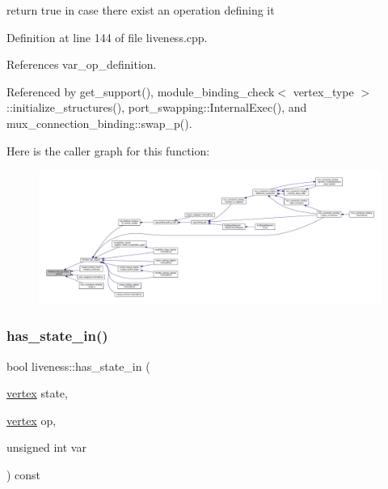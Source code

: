 return true in case there exist an operation defining it 



Definition at line 144 of file liveness.\+cpp.



References var\+\_\+op\+\_\+definition.



Referenced by get\+\_\+support(), module\+\_\+binding\+\_\+check$<$ vertex\+\_\+type $>$\+::initialize\+\_\+structures(), port\+\_\+swapping\+::\+Internal\+Exec(), and mux\+\_\+connection\+\_\+binding\+::swap\+\_\+p().

Here is the caller graph for this function\+:
\nopagebreak
\begin{figure}[H]
\begin{center}
\leavevmode
\includegraphics[width=350pt]{d3/d1f/classliveness_ad19baefb1c0ef1ca086dd9db88e572aa_icgraph}
\end{center}
\end{figure}
\mbox{\label{classliveness_af5d37bbdaab4f34613fa1979d4ad6090}} 
\subsubsection{\texorpdfstring{has\+\_\+state\+\_\+in()}{has\_state\_in()}}
{\footnotesize\ttfamily bool liveness\+::has\+\_\+state\+\_\+in (\begin{DoxyParamCaption}\item[{\hyperlink{graph_8hpp_abefdcf0544e601805af44eca032cca14}{vertex}}]{state,  }\item[{\hyperlink{graph_8hpp_abefdcf0544e601805af44eca032cca14}{vertex}}]{op,  }\item[{unsigned int}]{var }\end{DoxyParamCaption}) const}



